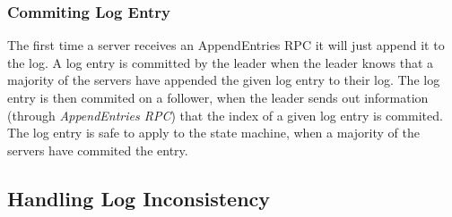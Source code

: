 
\subsubsection{Commiting Log Entry} %
\label{ssub:commiting_log_entry}

The first time a server receives an AppendEntries RPC it will just append it to the log. A log entry is committed by the leader when the leader knows that a majority of the servers have appended the given log entry to their log. The log entry is then commited on a follower, when the leader sends out information (through \emph{AppendEntries RPC}) that the index of a given log entry is commited. The log entry is safe to apply to the state machine, when a majority of the servers have commited the entry.


\subsection{Handling Log Inconsistency} %
\label{sub:handling_log_inconsistency}


